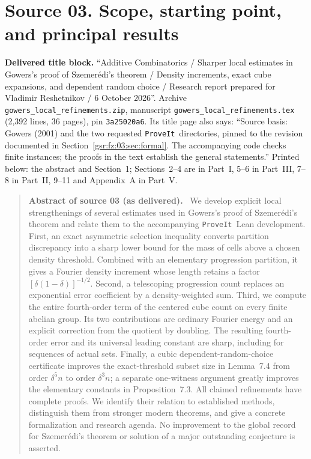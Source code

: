 \documentclass[11pt,letterpaper]{article}
\numberwithin{equation}{section}
\theoremstyle{definition}
\theoremstyle{remark}
\newcommand{\1}{\mathbf 1}
\newcommand{\repo}{\texttt{ProveIt}}
\newcommand{\file}[1]{\nolinkurl{#1}}
\newcommand{\srcnote}[2]{\par\noindent{\small\textit{Source #1, delivered #2.}}\par}
\newenvironment{partabstract}[1]{\begin{quote}\small\noindent\textbf{Abstract of source #1 (as delivered).}\ }{\end{quote}}
\newcommand{\partsource}[1]{\par\noindent\begin{minipage}{\textwidth}\small #1\end{minipage}\par\medskip}
\begin{document}
\section[{Source 03: Scope, starting point, and principal results}]{Source 03. Scope, starting point, and principal results}\label{gsr:fm:03:sec:d1}
\srcnote{03}{Section 1}
\partsource{\textbf{Delivered title block.} ``Additive Combinatorics / Sharper local estimates in Gowers's proof of Szemer\'edi's theorem / Density increments, exact cube expansions, and dependent random choice / Research report prepared for Vladimir Reshetnikov / 6 October 2026''. Archive \file{gowers\_local\_refinements.zip}, manuscript \file{gowers\_local\_refinements.tex} (2,392 lines, 36 pages), pin \texttt{3a25020a6}. Its title page also says: ``Source basis: Gowers (2001) and the two requested \repo\ directories, pinned to the revision documented in Section~\ref{gsr:fz:03:sec:formal}. The accompanying code checks finite instances; the proofs in the text establish the general statements.'' Printed below: the abstract and Section~1; Sections~2--4 are in Part~I, 5--6 in Part~III, 7--8 in Part~II, 9--11 and Appendix~A in Part~V.}
\begin{partabstract}{03}
We develop explicit local strengthenings of several estimates used in
Gowers's proof of Szemer\'edi's theorem and relate them to the accompanying
\repo\ Lean development. First, an exact asymmetric selection inequality
converts partition discrepancy into a sharp lower bound for the mass of
cells above a chosen density threshold. Combined with an elementary
progression partition, it gives a Fourier density increment whose length
retains a factor $[\delta(1-\delta)]^{-1/2}$. Second, a telescoping
progression count replaces an exponential error coefficient by a
density-weighted sum. Third, we compute the entire fourth-order term of
the centered cube count on every finite abelian group. Its two contributions
are ordinary Fourier energy and an explicit correction from the quotient
by doubling. The resulting fourth-order error and its universal leading
constant are sharp, including for sequences of actual sets. Finally, a
cubic dependent-random-choice certificate improves the exact-threshold
subset size in Lemma~7.4 from order $\delta^5n$ to order $\delta^3n$;
a separate one-witness argument greatly improves the elementary constants
in Proposition~7.3. All claimed refinements have complete proofs. We
identify their relation to established methods, distinguish them from
stronger modern theorems, and give a concrete formalization and research
agenda. No improvement to the global record for Szemer\'edi's theorem or
solution of a major outstanding conjecture is asserted.
\end{partabstract}
\label{gsr:fm:03:sec:intro}
\end{document}
